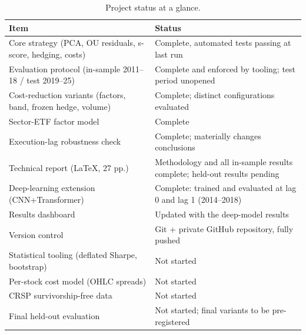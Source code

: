 \documentclass[11pt,a4paper]{article}
\begin{document}
\begin{table}[ht]
\centering
\caption{Project status at a glance.}
\label{tab:glance}
\small
\begin{tabular}{@{}>{\raggedright\arraybackslash}p{}>{\raggedright\arraybackslash}p{}@{}}
\toprule
Item & Status \\
\midrule
Core strategy (PCA, OU residuals, s-score, hedging, costs) & Complete, \MPNTests{} automated tests passing at last run \\
Evaluation protocol (in-sample 2011--18 / test 2019--25) & Complete and enforced by tooling; test period unopened \\
Cost-reduction variants (factors, band, frozen hedge, volume) & Complete; \MPNVariants{} distinct configurations evaluated \\
Sector-ETF factor model & Complete \\
Execution-lag robustness check & Complete; materially changes conclusions \\
Technical report (LaTeX, 27 pp.) & Methodology and all in-sample results complete; held-out results pending \\
Deep-learning extension (CNN+Transformer) & Complete: trained and evaluated at lag 0 and lag 1 (2014--2018) \\
Results dashboard & Updated with the deep-model results \\
Version control & Git + private GitHub repository, fully pushed \\
Statistical tooling (deflated Sharpe, bootstrap) & Not started \\
Per-stock cost model (OHLC spreads) & Not started \\
CRSP survivorship-free data & Not started \\
Final held-out evaluation & Not started; final variants to be pre-registered \\
\bottomrule
\end{tabular}
\end{table}
\end{document}
